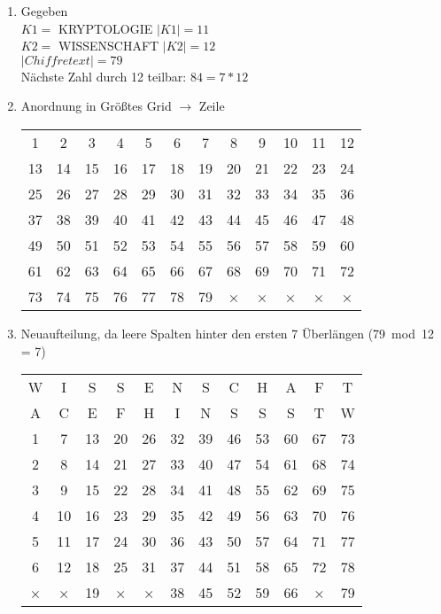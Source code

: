  \begin{enumerate}
    \item Gegeben\\
 $K1 =$ KRYPTOLOGIE $|K1| = 11$\\
 $K2 =$ WISSENSCHAFT $|K2| = 12$\\
 $|Chiffretext| = 79$\\
 Nächste Zahl durch 12 teilbar: $84 = 7 * 12$\\

     \item Anordnung in Größtes Grid $\rightarrow$ Zeile\\
     {%
     \newcommand{\mc}[3]{\multicolumn{#1}{#2}{#3}}

\begin{center}
\begin{tabular}{cccccccccccc}
1 & 2 & 3 & 4 & 5 & 6 & 7 & 8 & 9 & 10 & 11 & 12\\
13 & 14 & 15 & 16 & 17 & 18 & 19 & 20 & 21 & 22 & 23 & 24\\
25 & 26 & 27 & 28 & 29 & 30 & 31 & 32 & 33 & 34 & 35 & 36\\
37 & 38 & 39 & 40 & 41 & 42 & 43 & 44 & 45 & 46 & 47 & 48\\
49 & 50 & 51 & 52 & 53 & 54 & 55 & 56 & 57 & 58 & 59 & 60\\
61 & 62 & 63 & 64 & 65 & 66 & 67 & 68 & 69 & 70 & 71 & 72\\
73 & 74 & 75 & 76 & 77 & 78 & 79 & × & × & × & × & ×
 \end{tabular}
 \end{center}
}%

     \item Neuaufteilung, da leere Spalten hinter den ersten 7 Überlängen (79\ mod\ 12 = 7)\\

\begin{center}
\begin{tabular}{cccccccccccc}
W & I & S & S & E & N & S & C & H & A & F & T\\
A & C & E & F & H & I & N & S & S & S & T & W\\
1 & 7 & 13 & 20 & 26 & 32 & 39 & 46 & 53 & 60 & 67 & 73\\
2 & 8 & 14 & 21 & 27 & 33 & 40 & 47 & 54 & 61 & 68 & 74\\
3 & 9 & 15 & 22 & 28 & 34 & 41 & 48 & 55 & 62 & 69 & 75\\
4 & 10 & 16 & 23 & 29 & 35 & 42 & 49 & 56 & 63 & 70 & 76\\
5 & 11 & 17 & 24 & 30 & 36 & 43 & 50 & 57 & 64 & 71 & 77\\
6 & 12 & 18 & 25 & 31 & 37 & 44 & 51 & 58 & 65 & 72 & 78\\
× & × & 19 & × & × & 38 & 45 & 52 & 59 & 66 & × & 79
\end{tabular}
\end{center}


\end{enumerate}
